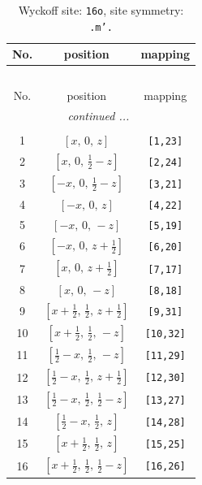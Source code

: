 \documentclass[fleqn,8pt]{jsarticle}
\begin{document}
\renewcommand{\arraystretch}{1.2}
\begin{longtable}{ccc}
\caption{Wyckoff site: {\tt 16o}, site symmetry: {\tt .m'.}}
 \\
 \hline \hline
No. & position & mapping \\ \hline \endfirsthead

\multicolumn{2}{l}{\tablename\ \thetable{}} \\
 \hline \hline
No. & position & mapping \\ \hline \endhead

 \hline \hline
\multicolumn{2}{r}{\footnotesize\it continued ...} \\ \endfoot

 \hline \hline
\multicolumn{2}{r}{} \\ \endlastfoot

1 & $\left[ x,\, 0,\, z \right]$ & {\tt [1,23]} \\ \hline
2 & $\left[ x,\, 0,\, \frac{1}{2} - z \right]$ & {\tt [2,24]} \\ \hline
3 & $\left[ - x,\, 0,\, \frac{1}{2} - z \right]$ & {\tt [3,21]} \\ \hline
4 & $\left[ - x,\, 0,\, z \right]$ & {\tt [4,22]} \\ \hline
5 & $\left[ - x,\, 0,\, - z \right]$ & {\tt [5,19]} \\ \hline
6 & $\left[ - x,\, 0,\, z + \frac{1}{2} \right]$ & {\tt [6,20]} \\ \hline
7 & $\left[ x,\, 0,\, z + \frac{1}{2} \right]$ & {\tt [7,17]} \\ \hline
8 & $\left[ x,\, 0,\, - z \right]$ & {\tt [8,18]} \\ \hline
9 & $\left[ x + \frac{1}{2},\, \frac{1}{2},\, z + \frac{1}{2} \right]$ & {\tt [9,31]} \\ \hline
10 & $\left[ x + \frac{1}{2},\, \frac{1}{2},\, - z \right]$ & {\tt [10,32]} \\ \hline
11 & $\left[ \frac{1}{2} - x,\, \frac{1}{2},\, - z \right]$ & {\tt [11,29]} \\ \hline
12 & $\left[ \frac{1}{2} - x,\, \frac{1}{2},\, z + \frac{1}{2} \right]$ & {\tt [12,30]} \\ \hline
13 & $\left[ \frac{1}{2} - x,\, \frac{1}{2},\, \frac{1}{2} - z \right]$ & {\tt [13,27]} \\ \hline
14 & $\left[ \frac{1}{2} - x,\, \frac{1}{2},\, z \right]$ & {\tt [14,28]} \\ \hline
15 & $\left[ x + \frac{1}{2},\, \frac{1}{2},\, z \right]$ & {\tt [15,25]} \\ \hline
16 & $\left[ x + \frac{1}{2},\, \frac{1}{2},\, \frac{1}{2} - z \right]$ & {\tt [16,26]} \\
\end{longtable}
\end{document}
